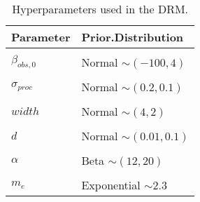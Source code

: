 \documentclass[
  portrait]{article}
\begin{document}
\begin{table}
\centering
\caption{\label{tab:priors}Hyperparameters used in the DRM.}
\centering
\fontsize{8}{10}\selectfont
\begin{tabu} to 
\toprule
Parameter & Prior.Distribution\\
\midrule
{} & \\
$\beta_{obs,0}$ & Normal $\sim (-100, 4)$\\
 & \\
$\sigma_{proc}$ & Normal $\sim (0.2, 0.1)$\\
 & \\
\addlinespace
$width$ & Normal $\sim (4, 2)$\\
 & \\
$d$ & Normal $\sim (0.01, 0.1)$\\
 & \\
$\alpha$ & Beta $\sim (12, 20)$\\
\addlinespace
{} & \\
$m_e$ & Exponential $\sim 2.3$\\
\bottomrule
\end{tabu}
\end{table}
\end{document}
